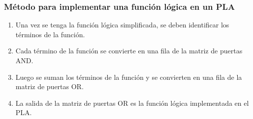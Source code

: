 \newpage
\subsubsection{Método para implementar una función lógica en un PLA}
\begin{mdframed}[backgroundcolor=gray!10,linewidth=0]
    \begin{enumerate}
        \item Una vez se tenga la función lógica simplificada, se deben identificar los términos de la función.
        \item Cada término de la función se convierte en una fila de la matriz de puertas AND.
        \item Luego se suman los términos de la función y se convierten en una fila de la matriz de puertas OR.
        \item La salida de la matriz de puertas OR es la función lógica implementada en el PLA.
    \end{enumerate}
\end{mdframed}
